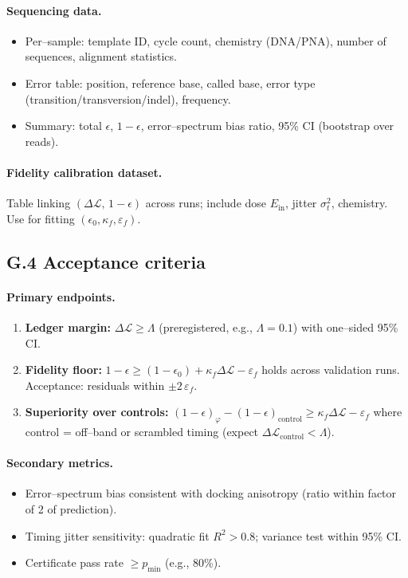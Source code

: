 \documentclass[11pt]{article}
\begin{document}
\paragraph{Sequencing data.}
\begin{itemize}
\item Per–sample: template ID, cycle count, chemistry (DNA/PNA), number of sequences, alignment statistics.
\item Error table: position, reference base, called base, error type (transition/transversion/indel), frequency.
\item Summary: total $\epsilon$, $1-\epsilon$, error–spectrum bias ratio, 95\% CI (bootstrap over reads).
\end{itemize}

\paragraph{Fidelity calibration dataset.}
Table linking $(\Delta\mathcal{L},\,1-\epsilon)$ across runs; include dose $E_{\mathrm{in}}$, jitter $\sigma_t^2$, chemistry. Use for fitting $(\epsilon_0,\kappa_f,\varepsilon_f)$.

\subsection*{G.4 Acceptance criteria}

\paragraph{Primary endpoints.}
\begin{enumerate}
\item \textbf{Ledger margin:} $\Delta\mathcal{L}\ge\Lambda$ (preregistered, e.g., $\Lambda=0.1$) with one–sided 95\% CI.
\item \textbf{Fidelity floor:} $1-\epsilon\ge (1-\epsilon_0)+\kappa_f\Delta\mathcal{L}-\varepsilon_f$ holds across validation runs. Acceptance: residuals within $\pm 2\,\varepsilon_f$.
\item \textbf{Superiority over controls:} $(1-\epsilon)_\varphi-(1-\epsilon)_{\mathrm{control}}\ge \kappa_f\Delta\mathcal{L}-\varepsilon_f$ where control = off–band or scrambled timing (expect $\Delta\mathcal{L}_{\mathrm{control}}<\Lambda$).
\end{enumerate}

\paragraph{Secondary metrics.}
\begin{itemize}
\item Error–spectrum bias consistent with docking anisotropy (ratio within factor of 2 of prediction).
\item Timing jitter sensitivity: quadratic fit $R^2>0.8$; variance test within 95\% CI.
\item Certificate pass rate $\ge p_{\min}$ (e.g., 80\%).
\end{itemize}
\end{document}
